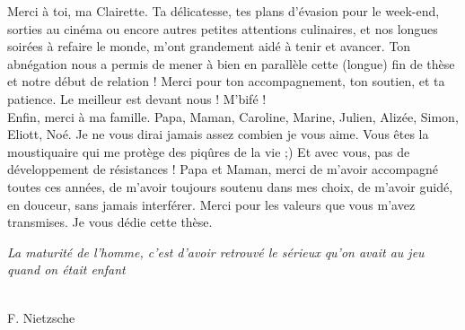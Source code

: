 \documentclass[12pt,twoside]{reedthesis}
\begin{document}
\begin{acknowledgements}
    Merci à toi, ma Clairette. Ta délicatesse, tes plans d'évasion pour le week-end, sorties au cinéma ou encore autres petites attentions culinaires, et nos longues soirées à refaire le monde, m'ont grandement aidé à tenir et avancer. Ton abnégation nous a permis de mener à bien en parallèle cette (longue) fin de thèse et notre début de relation ! Merci pour ton accompagnement, ton soutien, et ta patience. Le meilleur est devant nous ! M'bifé !\\

    Enfin, merci à ma famille. Papa, Maman, Caroline, Marine, Julien, Alizée, Simon, Eliott, Noé. Je ne vous dirai jamais assez combien je vous aime. Vous êtes la moustiquaire qui me protège des piqûres de la vie ;) Et avec vous, pas de développement de résistances ! Papa et Maman, merci de m'avoir accompagné toutes ces années, de m'avoir toujours soutenu dans mes choix, de m'avoir guidé, en douceur, sans jamais interférer. Merci pour les valeurs que vous m'avez transmises. Je vous dédie cette thèse.
  \end{acknowledgements}
  \begin{preface}
    \emph{La maturité de l'homme, c'est d'avoir retrouvé le sérieux qu'on avait au jeu quand on était enfant}\\
    \strut \\
    F. Nietzsche
  \end{preface}
\end{document}
